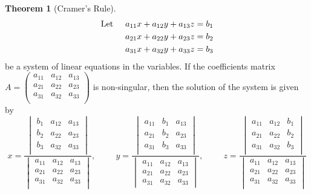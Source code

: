 \documentclass[11pt,a4paper]{article}
\theoremstyle{definition}
\newtheorem{thm}{Theorem}[subsection]
\begin{document}
\begin{thm}[Cramer's Rule]
\begin{align*}
\text{Let}\hspace{0.5cm} a_{11}x+a_{12}y+a_{13}z&=b_1\\a_{21}x+a_{22}y+a_{23}z&=b_2\\a_{31}x+a_{32}y+a_{33}z&=b_3
\end{align*}
be a system of linear equations in the variables. If the coefficients matrix $A=
\begin{pmatrix}
a_{11}&a_{12}&a_{13}\\a_{21}&a_{22}&a_{23}\\a_{31}&a_{32}&a_{33}\\
\end{pmatrix} 
$ is non-singular, then the solution of the system is given by 
$$x=\frac{
\begin{vmatrix}
b_1&a_{12}&a_{13}\\b_2&a_{22}&a_{23}\\b_3&a_{32}&a_{33}\\
\end{vmatrix}
}{
\begin{vmatrix}
a_{11}&a_{12}&a_{13}\\a_{21}&a_{22}&a_{23}\\a_{31}&a_{32}&a_{33}\\
\end{vmatrix}
},\hspace{1cm}
y=\frac{
\begin{vmatrix}
a_{11}&b_1&a_{13}\\a_{21}&b_2&a_{23}\\a_{31}&b_3&a_{33}\\
\end{vmatrix}
}{
\begin{vmatrix}
a_{11}&a_{12}&a_{13}\\a_{21}&a_{22}&a_{23}\\a_{31}&a_{32}&a_{33}
\end{vmatrix}
}
,\hspace{1cm}z=\frac{
\begin{vmatrix}
a_{11}&a_{12}&b_1\\a_{21}&a_{22}&b_2\\a_{31}&a_{32}&b_3\\
\end{vmatrix}
}{
\begin{vmatrix}
a_{11}&a_{12}&a_{13}\\a_{21}&a_{22}&a_{23}\\a_{31}&a_{32}&a_{33}\\
\end{vmatrix}
}
$$
\end{thm}
\end{document}
